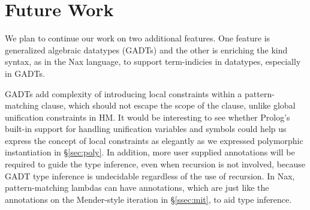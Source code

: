 \documentclass[runningheads,a4paper]{llncs}
\begin{document}
\section{Future Work}\label{sec:futwork}
We plan to continue our work on two additional features.
One feature is generalized algebraic datatypes (GADTs)
and the other is enriching the kind syntax, as in the
Nax language, to support term-indicies in datatypes,
especially in GADTs.

GADTs add complexity of introducing local constraints
within a pattern-matching clause, which should not escape
the scope of the clause, unlike global unification constraints in HM.
It would be interesting to see whether Prolog's built-in support for
handling unification variables and symbols could help us express
the concept of local constraints as elegantly as we expressed
polymorphic instantiation in \S\ref{sec:poly}. In addition,
more user supplied annotations will be required to guide the type inference,
even when recursion is not involved, because GADT type inference is
undecidable \cite{DegtyarevV95} regardless of the use of recursion.
In Nax, pattern-matching lambdas can have annotations, which are
just like the annotations on the Mender-style iteration in \S\ref{ssec:mit},
to aid type inference.
\end{document}
